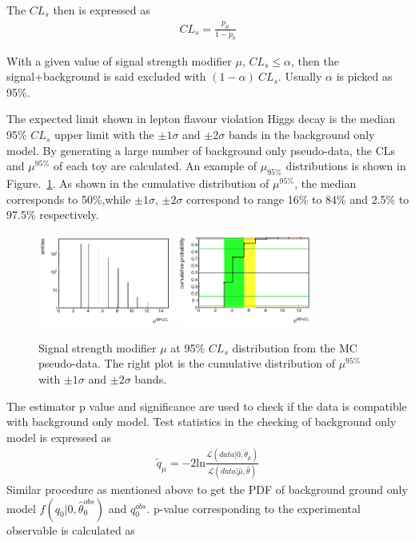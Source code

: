 The $CL_{s}$ then is expressed as
\begin{align*}
CL_{s}=\frac{p_{\mu}}{1-p_{b}}
\end{align*}

With a given value of signal strength modifier $\mu$, $CL_{s}\leq\alpha$, then the signal+background is said excluded with $(1-\alpha)~ CL_{s}$. Usually $\alpha$ is picked as 95\%.

The expected limit shown in lepton flavour violation Higgs decay is the median 95\% $CL_{s}$ upper limit with the $\pm 1 \sigma$ and $\pm 2 \sigma$ bands in the background only model. By generating a large number of background only pseudo-data, the CLs and $\mu^{95\%}$ of each toy are calculated. An example of $\mu_{95\%}$ distributions is shown in Figure.~\ref{fig:Signal_strength_example}. As shown in the cumulative distribution of $\mu^{95\%}$, the median corresponds to 50\%,while $\pm 1 \sigma$, $\pm 2 \sigma$  correspond to range 16\% to 84\% and 2.5\% to 97.5\% respectively.     
\begin{figure}[!tbp] 
\centering
\includegraphics[width=0.4\textwidth]{chapter7/Signal_strength_example_1.png}
\includegraphics[width=0.4\textwidth]{chapter7/Signal_strength_example_2.png}
\caption{Signal strength modifier $\mu$ at 95\% $CL_{s}$ distribution from the MC pseudo-data. The right plot is the cumulative distribution of $\mu^{95\%}$ with $\pm 1 \sigma$ and $\pm 2 \sigma$ bands.}
\label{fig:Signal_strength_example}
\end{figure}

The estimator p value and significance are used to check if the data is compatible with background only model. Test statistics in the checking of background only model is expressed as
\begin{align*}
\tilde{q}_{\mu}=-2\textrm{ln}\frac{\mathcal{L}(data|0,\tilde{\theta}_{\mu})}{\mathcal{L}(data|\hat{\mu},\hat{\theta})}
\end{align*}
Similar procedure as mentioned above to get the PDF of background ground only model $f(q_{0}|0,\hat{\theta}^{obs}_{0})$ and $q^{obs}_{0}$. p-value corresponding to the experimental observable is calculated as


